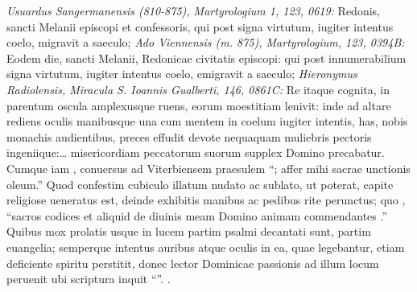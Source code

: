 \documentclass[a5paper,twoside]{article}
\begin{document}
\begin{pages}
\begin{Leftside}
{{\textit{Usuardus Sangermanensis (810-875), Martyrologium 1, 123, 0619:} Redonis, sancti Melanii episcopi et confessoris, qui post signa virtutum, iugiter intentus coelo, migravit a saeculo; 
\textit{Ado Viennensis (m. 875), Martyrologium, 123, 0394B:} Eodem die, sancti Melanii, Redonicae civitatis episcopi: qui post innumerabilium signa virtutum, iugiter intentus coelo, emigravit a saeculo; 
\textit{Hieronymus Radiolensis, Miracula S. Ioannis Gualberti, 146, 0861C:} Re itaque cognita, in parentum oscula amplexusque ruens, eorum moestitiam lenivit: inde ad altare rediens oculis manibusque una cum mentem in coelum iugiter intentis, has, nobis monachis audientibus, preces effudit devote nequaquam muliebris pectoris ingeniique:\dots
}} 
misericordiam peccatorum suorum supplex  Domino precabatur.  Cumque iam 
, 
conuersus ad Viterbiensem praesulem ``; affer mihi sacrae unctionis oleum.''  Quod confestim cubiculo illatum nudato ac sublato, ut poterat, capite religiose ueneratus est, deinde exhibitis manibus ac pedibus rite perunctus; quo  , ``sacros codices et aliquid de diuinis  meam Domino animam commendantes .''  Quibus mox prolatis usque in lucem partim psalmi decantati sunt, partim  euangelia; semperque intentus auribus atque oculis in ea, quae legebantur, etiam deficiente spiritu perstitit, donec lector Dominicae passionis ad illum locum peruenit ubi scriptura inquit ``''.  .

\end{Leftside}
\end{pages}
\end{document}
